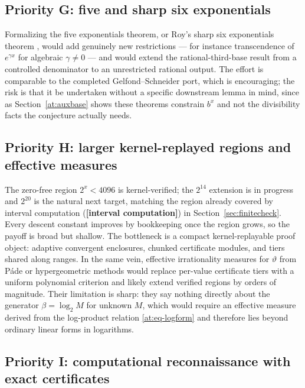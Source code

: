 \documentclass[11pt,oneside]{article}
\theoremstyle{definition}
\theoremstyle{remark}
\newcommand{\thetaq}{\vartheta}
\newcommand{\statuscomp}{\textcolor{computeviolet}{\textbf{[interval computation]}}}
\begin{document}
\subsection{Priority G: five and sharp six exponentials}
\label{at:prog-fiveexp}

Formalizing the five exponentials theorem, or Roy's sharp six exponentials theorem
\cite{Roy1992}, would add genuinely new restrictions --- for instance transcendence of
$e^{\gamma x}$ for algebraic $\gamma\ne0$ --- and would extend the rational-third-base
result from a controlled denominator to an unrestricted rational output.  The effort is
comparable to the completed Gelfond--Schneider port, which is encouraging; the risk is that
it be undertaken without a specific downstream lemma in mind, since as
Section~\ref{at:auxbase} shows these theorems constrain $b^{x}$ and not the divisibility
facts the conjecture actually needs.

\subsection{Priority H: larger kernel-replayed regions and effective measures}
\label{at:prog-finite}

The zero-free region $2^{x}<4096$ is kernel-verified; the $2^{14}$ extension is in progress
and $2^{20}$ is the natural next target, matching the region already covered by interval
computation (\statuscomp{}) in Section~\ref{sec:finitecheck}.  Every descent constant
improves by bookkeeping once the region grows, so the payoff is broad but shallow.  The
bottleneck is a compact kernel-replayable proof object: adaptive convergent enclosures,
chunked certificate modules, and tiers shared along ranges.  In the same vein, effective
irrationality measures for $\thetaq$ from P\'ade or hypergeometric methods would replace
per-value certificate tiers with a uniform polynomial criterion and likely extend verified
regions by orders of magnitude.  Their limitation is sharp: they say nothing directly about
the generator $\beta=\log_2M$ for unknown $M$, which would require an effective measure
derived from the log-product relation \eqref{at:eq-logform} and therefore lies beyond
ordinary linear forms in logarithms.

\subsection{Priority I: computational reconnaissance with exact certificates}
\label{at:prog-compute}
\end{document}
